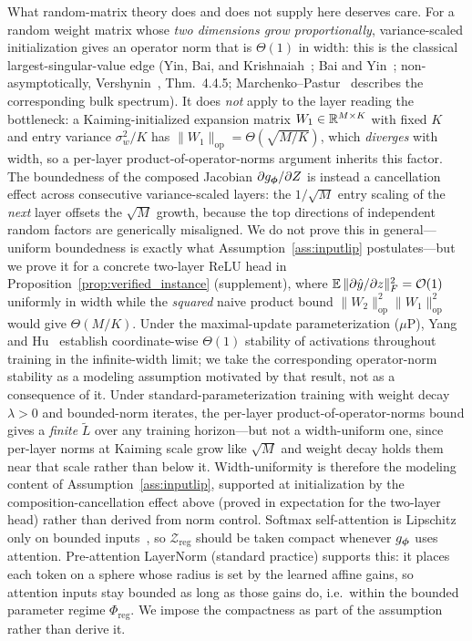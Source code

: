 \begin{remark}
What random-matrix theory does and does not supply here deserves
care. For a random weight matrix whose \emph{two dimensions grow
proportionally}, variance-scaled initialization gives an operator
norm that is $\Theta(1)$ in width: this is the classical
largest-singular-value edge (Yin, Bai, and
Krishnaiah~\cite{yin1988largest}; Bai and Yin~\cite{bai1993limit};
non-asymptotically, Vershynin~\cite{vershynin2018high},
Thm.~4.4.5; Marchenko--Pastur~\cite{marchenko1967distribution}
describes the corresponding bulk spectrum). It does \emph{not}
apply to the layer reading the bottleneck: a Kaiming-initialized
expansion matrix $W_1 \in \mathbb{R}^{M \times K}$ with fixed $K$ and entry
variance $\sigma_w^2/K$ has $\|W_1\|_{\mathrm{op}} =
\Theta(\sqrt{M/K})$, which \emph{diverges} with width, so a
per-layer product-of-operator-norms argument inherits this factor.
The boundedness of the composed Jacobian
$\partial g_{\boldsymbol{\phi}}/\partial Z$ is instead a cancellation effect
across consecutive variance-scaled layers: the $1/\sqrt{M}$ entry
scaling of the \emph{next} layer offsets the $\sqrt{M}$ growth,
because the top directions of independent random factors are
generically misaligned. We do not prove this in general---uniform
boundedness is exactly what Assumption~\ref{ass:inputlip}
postulates---but we prove it for a concrete two-layer ReLU head in
Proposition~\ref{prop:verified_instance} (supplement), where
$\mathbb{E}\,\|\partial \hat{y}/\partial z\|_F^2 = \mathcal{O}(1)$
uniformly in width while the \emph{squared} naive product bound
$\|W_2\|_{\mathrm{op}}^2 \|W_1\|_{\mathrm{op}}^2$ would give
$\Theta(M/K)$. Under the maximal-update
parameterization ($\mu$P), Yang and
Hu~\cite{yang2021tensor} establish coordinate-wise $\Theta(1)$
stability of activations throughout training in the infinite-width
limit; we take the corresponding operator-norm stability as a
modeling assumption motivated by that result, not as a consequence
of it. Under standard-parameterization training with weight
decay $\lambda > 0$ and bounded-norm iterates, the per-layer
product-of-operator-norms bound gives a \emph{finite}
$\widetilde{L}$ over any training horizon---but not a
width-uniform one, since per-layer norms at Kaiming scale grow like
$\sqrt{M}$ and weight decay holds them near that scale rather than
below it. Width-uniformity is therefore the modeling content of
Assumption~\ref{ass:inputlip}, supported at initialization by the
composition-cancellation effect above (proved in expectation for
the two-layer head) rather than derived from norm control. Softmax self-attention is Lipschitz
only on bounded inputs~\cite{kim2021lipschitz}, so
$\mathcal{Z}_{\mathrm{reg}}$ should be taken compact whenever
$g_{\boldsymbol{\phi}}$ uses attention. Pre-attention LayerNorm (standard
practice) supports this: it places each token on a sphere whose
radius is set by the learned affine gains, so attention inputs stay
bounded as long as those gains do, i.e.\ within the bounded
parameter regime $\Phi_{\mathrm{reg}}$. We impose the compactness
as part of the assumption rather than derive it.
\end{remark}

